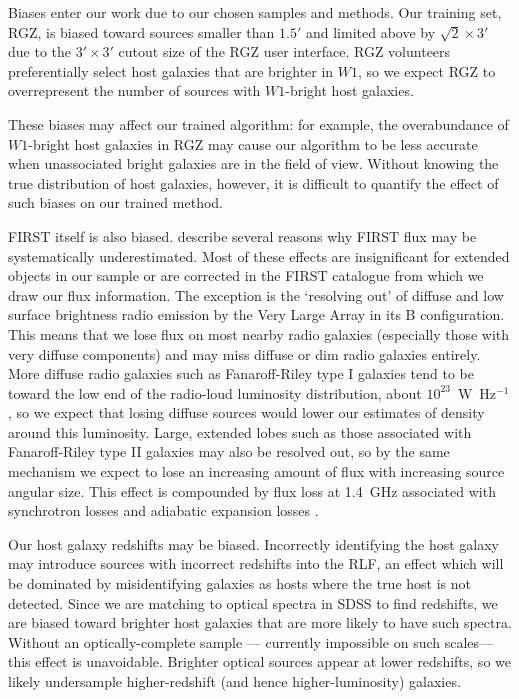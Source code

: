 \documentclass[11pt, a4paper]{book}
\begin{document}
    Biases enter our work due to our chosen samples and methods. Our training set,
    RGZ, is biased toward sources smaller than $1.5'$ and limited above by $\sqrt{2}
    \times 3'$ due to the $3' \times 3'$ cutout size of the RGZ user
    interface. RGZ volunteers preferentially select host
    galaxies that are brighter in $W1$, so we expect RGZ to overrepresent
    the number of sources with $W1$-bright host galaxies.

    These biases may affect our
    trained algorithm: for example, the overabundance of $W1$-bright host
    galaxies in RGZ may cause our algorithm to be less accurate when
    unassociated bright galaxies are in the field of view. Without knowing the true
    distribution of host galaxies, however, it is difficult to quantify the
    effect of such biases on our trained method.

    FIRST itself is also biased. \citet{helfand15first} describe several reasons why FIRST flux may be systematically underestimated. Most of these effects are insignificant for extended objects in our sample or are corrected in the FIRST catalogue from which we draw our flux information. The exception is the `resolving out' of diffuse and low surface brightness radio emission by the Very Large Array in its B configuration. This means that we lose flux on most nearby radio galaxies (especially those with very
    diffuse components) and may miss diffuse or dim radio galaxies entirely.
    More diffuse radio galaxies such as Fanaroff-Riley type I \citep[FRI;][]{fanaroff1974} galaxies tend to
    be toward the low end of the radio-loud luminosity distribution, about
    $10^{23}$~W~Hz$^{-1}$ \citep{best09radio}, so we expect that losing
    diffuse sources would lower our estimates of density around this
    luminosity. Large, extended lobes such as those associated with Fanaroff-Riley type II \citep[FRII;][]{fanaroff1974} galaxies may also be resolved out, so by the same mechanism we expect to lose an increasing amount of flux with increasing source angular size. This effect is compounded by flux loss at 1.4~GHz associated with synchrotron losses and adiabatic expansion losses \citep{blundell99doubles}.

    Our host galaxy redshifts may be biased. Incorrectly identifying the host galaxy may introduce sources with incorrect redshifts into the RLF, an effect which will be dominated by misidentifying galaxies as hosts where the true host is not detected. Since we are matching to optical spectra in SDSS to find
    redshifts, we are biased toward brighter host galaxies that are more
    likely to have such spectra. Without an optically-complete sample ---
    currently impossible on such scales---this effect is unavoidable.
    Brighter optical sources appear at lower redshifts, so we likely
    undersample higher-redshift (and hence higher-luminosity) galaxies.
\end{document}

